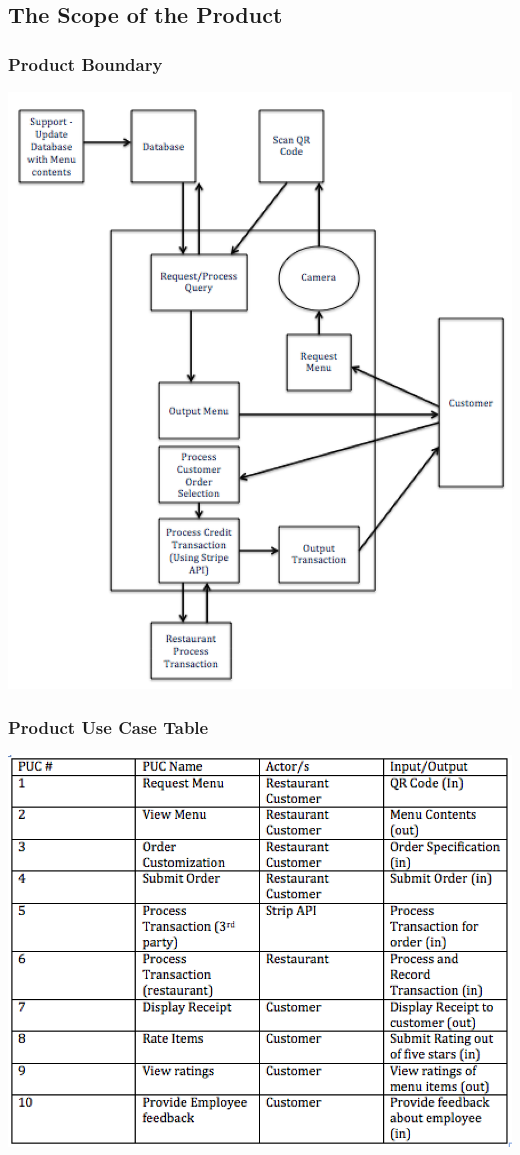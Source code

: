 \documentclass[12pt, titlepage]{article}
\begin{document}
\subsection{The Scope of the Product}
\subsubsection{Product Boundary}
\includegraphics{ProductBoundary.png}
\subsubsection{Product Use Case Table}
\includegraphics{PUC.png}
\end{document}

